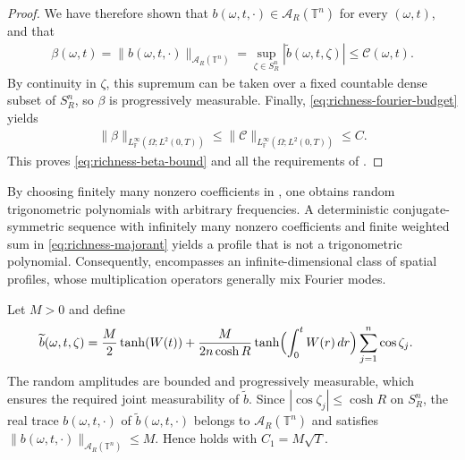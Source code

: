 \documentclass[print,wide]{draft}
\begin{document}
\begin{proof}
We have therefore shown that \(b(\omega,t,\cdot)\in\mathcal A_R(\mathbb T^n)\) for every \((\omega,t)\), and that
\begin{align*}
\beta(\omega,t)
=\|b(\omega,t,\cdot)\|_{\mathcal A_R(\mathbb T^n)}
=\sup_{\zeta\in S_R^n}|\widetilde b(\omega,t,\zeta)|
\le \mathcal C(\omega,t).
\end{align*}
By continuity in \(\zeta\), this supremum can be taken over a fixed countable dense subset of \(S_R^n\), so \(\beta\) is progressively measurable. Finally, \eqref{eq:richness-fourier-budget} yields
\begin{align*}
\|\beta\|_{L^\infty_{\mathbb F}(\Omega;L^2(0,T))}
\le\|\mathcal C\|_{L^\infty_{\mathbb F}(\Omega;L^2(0,T))}
\le C.
\end{align*}
This proves \eqref{eq:richness-beta-bound} and all the requirements of .
\end{proof}

By choosing finitely many nonzero coefficients in , one obtains random trigonometric polynomials with arbitrary frequencies. A deterministic conjugate-symmetric sequence with infinitely many nonzero coefficients and finite weighted sum in \eqref{eq:richness-majorant} yields a profile that is not a trigonometric polynomial. Consequently,  encompasses an infinite-dimensional class of spatial profiles, whose multiplication operators generally mix Fourier modes.

\begin{example}
Let \(M>0\) and define
\begin{align*}
\widetilde b(\omega,t,\zeta)
={}&\frac M2\tanh(W(t))
+\frac{M}{2n\cosh R}
\tanh\Bigl(\int_0^tW(r)\,dr\Bigr)
\sum_{j=1}^n\cos\zeta_j.
\end{align*}
The random amplitudes are bounded and progressively measurable, which ensures the required joint measurability of \(\widetilde b\).
Since \(|\cos\zeta_j|\le\cosh R\) on \(S_R^n\), the real trace \(b(\omega,t,\cdot)\) of \(\widetilde b(\omega,t,\cdot)\) belongs to \(\mathcal A_R(\mathbb T^n)\) and satisfies
$
\|b(\omega,t,\cdot)\|_{\mathcal A_R(\mathbb T^n)}\le M$. 
Hence  holds with \(C_1=M\sqrt T\).
\end{example}
\end{document}
